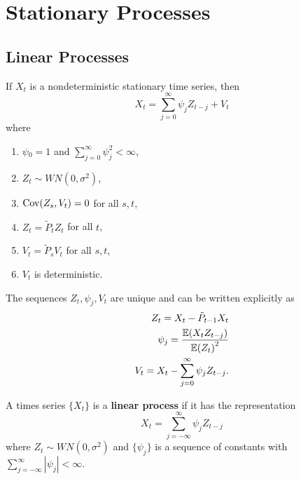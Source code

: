 
\section{Stationary Processes}
\label{sec:stationary-processes-1}

\subsection{Linear Processes}
\label{sec:linear-processes}

\begin{defn}
  \label{defn:stationary_processes:1}
  If $X_{t}$ is a nondeterministic stationary time series, then
  \begin{equation}
    \label{eq:9}
    X_{t} = \sum_{j=0}^{\infty} \psi_{j} Z_{t-j} + V_{t}
  \end{equation} where
  \begin{enumerate}
  \item $\psi{_0} = 1$ and $\sum_{j=0}^{\infty} \psi_{j}^{2} <
    \infty$,
  \item $Z_{t} \sim WN(0, \sigma^{2})$,
  \item $\Cov{Z_{s}}{V_{t}} = 0$ for all $s, t$,
  \item $Z_{t} = \tilde P_{t} Z_{t}$ for all $t$,
  \item $V_{t} = \tilde P_{s} V_{t}$ for all $s, t$,
  \item $V_{t}$ is deterministic.
  \end{enumerate}
  The sequences $Z_{t}, \psi_{j}, V_{t}$ are unique and can be written
  explicitly as
  \begin{align}
    \label{eq:9}
    Z_{t} = X_{t} - \tilde P_{t-1} X_{t} \\
    \psi_{j} = \frac{\E{X_{t} Z_{t-j}}}{\E{Z_{t}}^{2}} \\
    V_{t} = X_{t} - \sum_{j=0}^{\infty} \psi_{j} Z_{t-j}.
  \end{align}
\end{defn}

\begin{defn}
  \label{defn:stationary_processes:1}
  A times series $\{ X_{t} \}$ is a \textbf{linear process} if it has
  the representation
  \begin{equation}
    \label{eq:9}
    X_{t} = \sum_{j=-\infty}^{\infty} \psi_{j} Z_{t-j}
  \end{equation}
  where $Z_{t} \sim WN(0, \sigma^{2})$ and $\{ \psi_{j} \}$ is a
  sequence of constants with $\sum_{j=-\infty}^{\infty} |\psi_{j}| <
  \infty$.
\end{defn}

